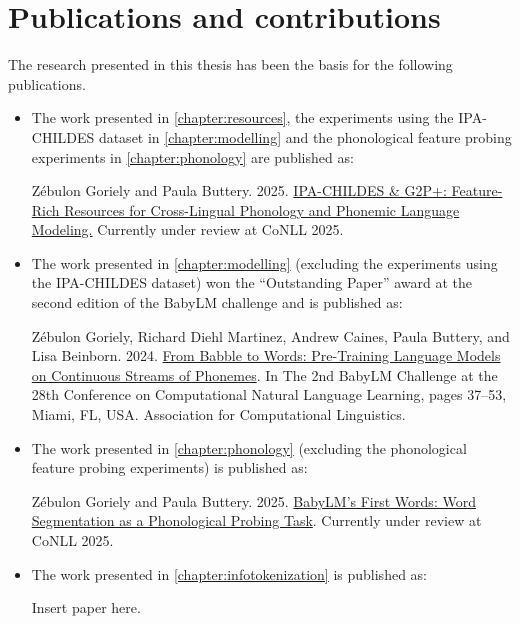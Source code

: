 \section{Publications and contributions}

The research presented in this thesis has been the basis for the following publications.

\begin{itemize}
\item The work presented in \cref{chapter:resources}, the experiments using the IPA-CHILDES dataset in \cref{chapter:modelling} and the phonological feature probing experiments in \cref{chapter:phonology} are published as:

\begin{mdframed}[linewidth=1pt]
Zébulon Goriely and Paula Buttery. 2025. \href{https://arxiv.org/abs/2504.03036}{IPA-CHILDES \& G2P+: Feature-Rich Resources for Cross-Lingual Phonology and Phonemic Language Modeling.} Currently under review at CoNLL 2025.
\end{mdframed}

\item The work presented in \cref{chapter:modelling} (excluding the experiments using the IPA-CHILDES dataset) won the ``Outstanding Paper'' award at the second edition of the BabyLM challenge and is published as:

\begin{mdframed}[linewidth=1pt]
Zébulon Goriely, Richard Diehl Martinez, Andrew Caines, Paula Buttery, and Lisa Beinborn. 2024. \href{https://aclanthology.org/2024.conll-babylm.4/#}{From Babble to Words: Pre-Training Language Models on Continuous Streams of Phonemes}. In The 2nd BabyLM Challenge at the 28th Conference on Computational Natural Language Learning, pages 37–53, Miami, FL, USA. Association for Computational Linguistics.
\end{mdframed}

\item The work presented in \cref{chapter:phonology} (excluding the phonological feature probing experiments) is published as:
\begin{mdframed}[linewidth=1pt]
Zébulon Goriely and Paula Buttery. 2025. \href{https://arxiv.org/abs/2504.03338}{BabyLM's First Words: Word Segmentation as a Phonological Probing Task}. Currently under review at CoNLL 2025.
\end{mdframed}

\item The work presented in \cref{chapter:infotokenization} is published as:
\begin{mdframed}[linewidth=1pt]
Insert paper here.
\end{mdframed}
\end{itemize}

